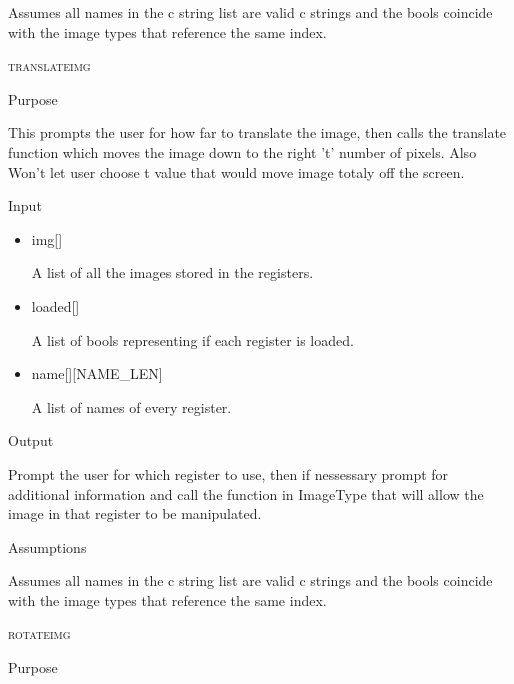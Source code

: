 \documentclass[pdftex, 11pt]{article}
\begin{document}
\begin{description}
\begin{description}
				Assumes all names in the c string list are valid c
				strings and the bools coincide with the image types that
				reference the same index.

		\end{description}



	\item{\textsc{translateimg}}
		\begin{description}
			\item{Purpose}
			
				This prompts the user for how far to translate the image, then calls the
				translate function which moves the image down to the right 't' number of
				pixels.  Also Won't let user choose t value that would move image totaly off
				the screen.

			\item{Input}

				\begin{itemize}

					\item{img[]}

						A list of all the images stored in the registers.

					\item{loaded[]}

						A list of bools representing if each register is loaded.

					\item{name[][NAME\_LEN]}

						A list of names of every register.

				\end{itemize}

			\item{Output}

				Prompt the user for which register to use, then if nessessary
				prompt for additional information and call the function
				in ImageType that will allow the image in that register to
				be manipulated.

			\item{Assumptions}

				Assumes all names in the c string list are valid c
				strings and the bools coincide with the image types that
				reference the same index.

		\end{description}



	\item{\textsc{rotateimg}}
		\begin{description}
			\item{Purpose}


\end{description}
\end{description}
\end{document}

